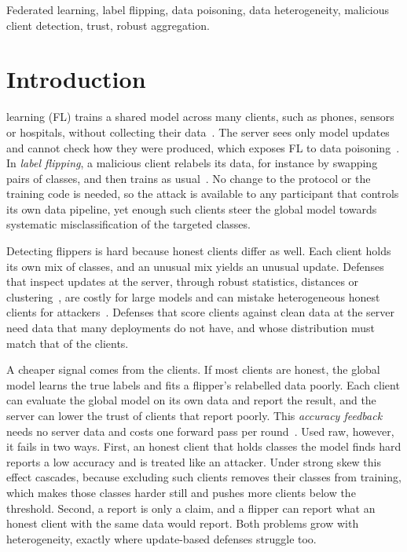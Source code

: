 \documentclass[journal]{IEEEtran}
\begin{document}
\begin{IEEEkeywords}
Federated learning, label flipping, data poisoning, data heterogeneity, malicious client detection, trust, robust aggregation.
\end{IEEEkeywords}

\section{Introduction}
\label{sec:intro}
 learning (FL) trains a shared model across many clients, such as phones, sensors or hospitals, without collecting their data~\cite{fedavg-pmlr-v54-mcmahan17a,kairouz2021advances}. The server sees only model updates and cannot check how they were produced, which exposes FL to data poisoning~\cite{lyu2020threats}. In \emph{label flipping}, a malicious client relabels its data, for instance by swapping pairs of classes, and then trains as usual~\cite{biggio2011support,tolpegin2020data}. No change to the protocol or the training code is needed, so the attack is available to any participant that controls its own data pipeline, yet enough such clients steer the global model towards systematic misclassification of the targeted classes.

Detecting flippers is hard because honest clients differ as well. Each client holds its own mix of classes, and an unusual mix yields an unusual update. Defenses that inspect updates at the server, through robust statistics, distances or clustering~\cite{yin2018byzantine,NIPS2017_f4b9ec30,nguyen2022flame,jebreel2024lfighter}, are costly for large models and can mistake heterogeneous honest clients for attackers~\cite{li2023hscs,shen2024lfrppfl}. Defenses that score clients against clean data at the server~\cite{cao2020fltrust} need data that many deployments do not have, and whose distribution must match that of the clients.

A cheaper signal comes from the clients. If most clients are honest, the global model learns the true labels and fits a flipper's relabelled data poorly. Each client can evaluate the global model on its own data and report the result, and the server can lower the trust of clients that report poorly. This \emph{accuracy feedback} needs no server data and costs one forward pass per round~\cite{andreina2021baffle,jiang2023dataquality}. Used raw, however, it fails in two ways. First, an honest client that holds classes the model finds hard reports a low accuracy and is treated like an attacker. Under strong skew this effect cascades, because excluding such clients removes their classes from training, which makes those classes harder still and pushes more clients below the threshold. Second, a report is only a claim, and a flipper can report what an honest client with the same data would report. Both problems grow with heterogeneity, exactly where update-based defenses struggle too.
\end{document}
